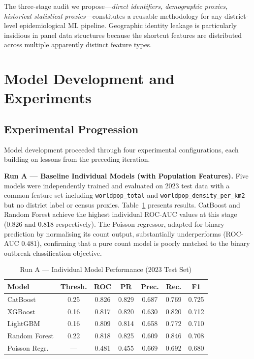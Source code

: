 \documentclass[conference]{IEEEtran}
\begin{document}
The three-stage audit we propose---\emph{direct identifiers,
demographic proxies, historical statistical proxies}---constitutes
a reusable methodology for any district-level epidemiological ML
pipeline. Geographic identity leakage is particularly insidious in
panel data structures because the shortcut features are distributed
across multiple apparently distinct feature types.

\section{Model Development and Experiments}
\label{sec:models}

\subsection{Experimental Progression}

Model development proceeded through four experimental configurations,
each building on lessons from the preceding iteration.

\textbf{Run A --- Baseline Individual Models (with Population Features).}
Five models were independently trained and evaluated on 2023 test
data with a common feature set including \texttt{worldpop\_total}
and \texttt{worldpop\_density\_per\_km2} but no district label or
census proxies. Table~\ref{tab:run_a} presents results. CatBoost
and Random Forest achieve the highest individual ROC-AUC values at
this stage (0.826 and 0.818 respectively). The Poisson regressor,
adapted for binary prediction by normalising its count output,
substantially underperforms (ROC-AUC 0.481), confirming that a
pure count model is poorly matched to the binary outbreak
classification objective.

\begin{table}[htbp]
  \caption{Run A --- Individual Model Performance (2023 Test Set)}
  \label{tab:run_a}
  \centering
  \renewcommand{\arraystretch}{1.15}
  \setlength{\tabcolsep}{3pt}
  \begin{tabular}{lcccccc}
    \toprule
    \textbf{Model} & \textbf{Thresh.} & \textbf{ROC} &
    \textbf{PR} & \textbf{Prec.} & \textbf{Rec.} & \textbf{F1} \\
    \midrule
    CatBoost       & 0.25 & 0.826 & 0.829 & 0.687 & 0.769 & 0.725 \\
    XGBoost        & 0.16 & 0.817 & 0.820 & 0.630 & 0.820 & 0.712 \\
    LightGBM       & 0.16 & 0.809 & 0.814 & 0.658 & 0.772 & 0.710 \\
    Random Forest  & 0.22 & 0.818 & 0.825 & 0.609 & 0.846 & 0.708 \\
    Poisson Regr.  & ---  & 0.481 & 0.455 & 0.669 & 0.692 & 0.680 \\
    \bottomrule
  \end{tabular}
\end{table}
\end{document}
